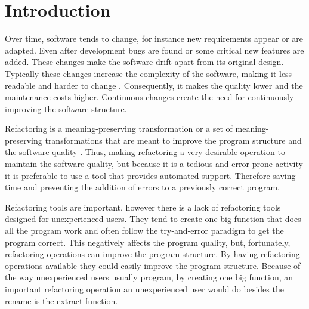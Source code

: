 
% 
% 

\section{Introduction}


Over time, software tends to change, for instance new requirements appear or are adapted. 
Even after development bugs are found or some critical new features are added.
These changes make the software drift apart from its original design.
Typically these changes increase the complexity of the software, making it less readable and harder to change \cite{mens2003refactoring}. 
Consequently, it makes the quality lower and the maintenance costs higher.
Continuous changes create the need for continuously improving the software structure.

Refactoring is a meaning-preserving transformation or a set of meaning-preserving transformations that are meant to improve the program structure and the software quality \cite{bourquin2007high}.
Thus, making refactoring a very desirable operation to maintain the software quality, but because it is a tedious and error prone activity it is preferable to use a tool that provides automated support. 
Therefore saving time and preventing the addition of errors to a previously correct program.

%
Refactoring tools are important, however there is a lack of refactoring tools designed for unexperienced users.
They tend to create one big function that does all the program work and often follow the try-and-error paradigm to get the program correct.
This negatively affects the program quality, but, fortunately, refactoring operations can improve the program structure.
By having refactoring operations available they could easily improve the program structure.
Because of the way unexperienced users usually program, by creating one big function, an important refactoring operation an unexperienced user would do besides the rename is the extract-function.

